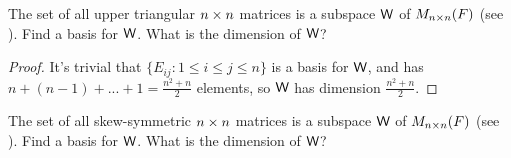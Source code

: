 \begin{exercise} \label{exercise 1.6.16}
The set of all upper triangular \(n \times n\) matrices is a subspace \(\textsf{W}\) of \(M_{n \times n}(F)\) (see ).
Find a basis for \(\textsf{W}\).
What is the dimension of \(\textsf{W}\)?
\end{exercise}

\begin{proof}
It's trivial that \(\{ E_{ij} : 1 \le i \le j \le n \}\) is a basis for \(\textsf{W}\), and has \(n + (n - 1) + ... + 1 = \frac{n^2 + n}{2}\) elements, so \(\textsf{W}\) has dimension \(\frac{n^2 + n}{2}\).
\end{proof}

\begin{exercise} \label{exercise 1.6.17}
The set of all skew-symmetric \(n \times n\) matrices is a subspace \(\textsf{W}\) of \(M_{n \times n}(F)\) (see ).
Find a basis for \(\textsf{W}\).
What is the dimension of \(\textsf{W}\)?
\end{exercise}

